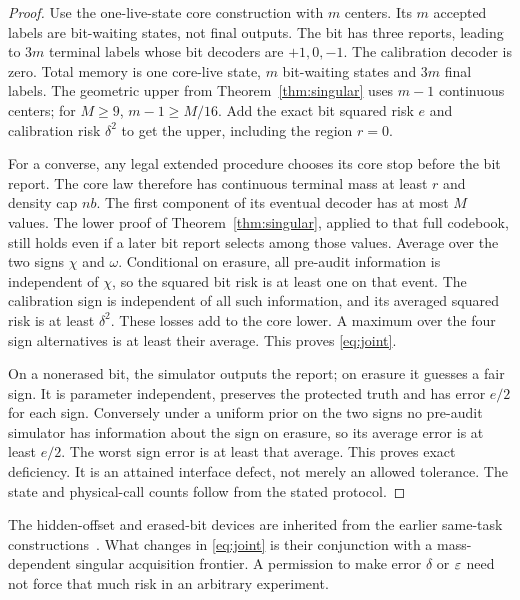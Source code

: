 \begin{proof}
Use the one-live-state core construction with $m$ centers. Its $m$ accepted labels are bit-waiting states, not final outputs. The bit has three reports, leading to $3m$ terminal labels whose bit decoders are $+1,0,-1$. The calibration decoder is zero. Total memory is one core-live state, $m$ bit-waiting states and $3m$ final labels. The geometric upper from Theorem~\ref{thm:singular} uses $m-1$ continuous centers; for $M\ge9$, $m-1\ge M/16$. Add the exact bit squared risk $e$ and calibration risk $\delta^2$ to get the upper, including the region $r=0$.

For a converse, any legal extended procedure chooses its core stop before the bit report. The core law therefore has continuous terminal mass at least $r$ and density cap $nb$. The first component of its eventual decoder has at most $M$ values. The lower proof of Theorem~\ref{thm:singular}, applied to that full codebook, still holds even if a later bit report selects among those values. Average over the two signs $\chi$ and $\omega$. Conditional on erasure, all pre-audit information is independent of $\chi$, so the squared bit risk is at least one on that event. The calibration sign is independent of all such information, and its averaged squared risk is at least $\delta^2$. These losses add to the core lower. A maximum over the four sign alternatives is at least their average. This proves \eqref{eq:joint}.

On a nonerased bit, the simulator outputs the report; on erasure it guesses a fair sign. It is parameter independent, preserves the protected truth and has error $e/2$ for each sign. Conversely under a uniform prior on the two signs no pre-audit simulator has information about the sign on erasure, so its average error is at least $e/2$. The worst sign error is at least that average. This proves exact deficiency. It is an attained interface defect, not merely an allowed tolerance. The state and physical-call counts follow from the stated protocol.
\end{proof}

The hidden-offset and erased-bit devices are inherited from the earlier same-task constructions~\cite{GTF49,GTF32}. What changes in \eqref{eq:joint} is their conjunction with a mass-dependent singular acquisition frontier. A permission to make error $\delta$ or $\varepsilon$ need not force that much risk in an arbitrary experiment.
